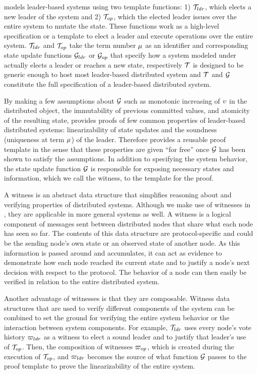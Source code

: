 {\sysname{} models leader-based systems using two template functions:
1) $\mathcal{T}_{ldr}$, which elects a new leader of the system and
2) $\mathcal{T}_{op}$, which the elected leader issues over the entire system
to mutate the state. These functions work as a high-level specification or a
template to elect a leader and execute operations over the entire system.
$\mathcal{T}_{ldr}$ and $\mathcal{T}_{op}$ take the term number $\mu$ as an identifier
and corresponding state update functions $\mathcal{G}_{ldr}$ or
$\mathcal{G}_{op}$ that specify how a system modeled under \sysname{}
actually elects a leader or reaches a new state, respectively 
$\mathcal{T}$ is designed to be generic enough to host most
leader-based distributed system and $\mathcal{T}$ and $\mathcal{G}$
constitute the full specification of a leader-based distributed system.


By making a few assumptions  about $\mathcal{G}$
such as monotonic increasing of $\upsilon$ in the distributed object,
the immutability of previous committed values, and atomicity of the resulting
state, \sysname{} provides proofs of few common properties of leader-based distributed systems:
linearizability of state updates and the soundness (uniqueness at term $\mu$)
of the leader.
Therefore \sysname{} provides a reusable proof template in the sense that these properties
are given ``for free'' once $\mathcal{G}$ has been shown to satisfy the assumptions.
In addition to specifying the system behavior,
the state update function $\mathcal{G}$ is responsible for exposing necessary
states and information, which we call the witness, to the template for the proof.

A witness is an abstract data structure that simplifies reasoning about and
verifying properties of distributed systems. Although we make use of witnesses
in \sysname{}, they are applicable in more general systems as well. A witness is
a logical component of messages sent between distributed nodes that share what
each node has seen so far. The contents of this data structure are
protocol-specific and could be the sending node's own state or an observed state
of another node. As this information is passed around and accumulates, it can
act as evidence to demonstrate how each node reached its current state and to
justify a node's next decision with respect to the protocol. The behavior of a
node can then easily be verified in relation to the entire distributed system.

Another advantage of witnesses is that they are composable. Witness data
structures that are used to verify different components of the system can be
combined to set the ground for verifying the entire system behavior or the
interaction between system components. For example, $\mathcal{T}_{ldr}$ uses every
node's vote history ${\varpi_{ldr}}$ as a witness to elect a sound leader and to
justify that leader's use of $\mathcal{T}_{op}$. Then, the composition of witnesses
${\varpi_{op}}$, which is created during the execution of $\mathcal{T}_{op}$, and
${\varpi_{ldr}}$ becomes the source of what function $\mathcal{G}$ passes to
the proof template to prove the linearizability of the entire system.


}
